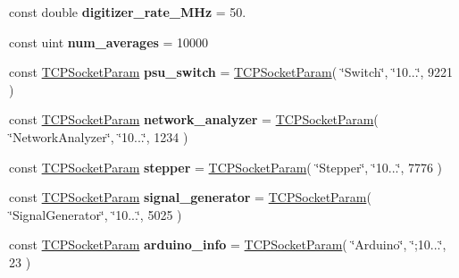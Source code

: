 \begin{DoxyCompactItemize}
\item 
const double {\bfseries digitizer\+\_\+rate\+\_\+\+M\+Hz} = 50.\hypertarget{class_program_core_aa9992b9fddefaca7399aa0e4d8915b0e}{}\label{class_program_core_aa9992b9fddefaca7399aa0e4d8915b0e}

\item 
const uint {\bfseries num\+\_\+averages} = 10000\hypertarget{class_program_core_abce03c26b1e9faefd046b7e2dd4d4b66}{}\label{class_program_core_abce03c26b1e9faefd046b7e2dd4d4b66}

\item 
const \hyperlink{struct_t_c_p_socket_param}{T\+C\+P\+Socket\+Param} {\bfseries psu\+\_\+switch} = \hyperlink{struct_t_c_p_socket_param}{T\+C\+P\+Socket\+Param}( \char`\"{}Switch\char`\"{}, \char`\"{}10...\char`\"{}, 9221 )\hypertarget{class_program_core_a18db700c26844c7ed10e13f3dd0cffbc}{}\label{class_program_core_a18db700c26844c7ed10e13f3dd0cffbc}

\item 
const \hyperlink{struct_t_c_p_socket_param}{T\+C\+P\+Socket\+Param} {\bfseries network\+\_\+analyzer} = \hyperlink{struct_t_c_p_socket_param}{T\+C\+P\+Socket\+Param}( \char`\"{}Network\+Analyzer\char`\"{}, \char`\"{}10...\char`\"{}, 1234 )\hypertarget{class_program_core_acd4885b458ad85149c05a80173e80d83}{}\label{class_program_core_acd4885b458ad85149c05a80173e80d83}

\item 
const \hyperlink{struct_t_c_p_socket_param}{T\+C\+P\+Socket\+Param} {\bfseries stepper} = \hyperlink{struct_t_c_p_socket_param}{T\+C\+P\+Socket\+Param}( \char`\"{}Stepper\char`\"{}, \char`\"{}10...\char`\"{}, 7776 )\hypertarget{class_program_core_a6e15b2406364dccbf520eaff3c052121}{}\label{class_program_core_a6e15b2406364dccbf520eaff3c052121}

\item 
const \hyperlink{struct_t_c_p_socket_param}{T\+C\+P\+Socket\+Param} {\bfseries signal\+\_\+generator} = \hyperlink{struct_t_c_p_socket_param}{T\+C\+P\+Socket\+Param}( \char`\"{}Signal\+Generator\char`\"{}, \char`\"{}10...\char`\"{}, 5025 )\hypertarget{class_program_core_aa6ae7b4297a8d148cad8d360a6ca605b}{}\label{class_program_core_aa6ae7b4297a8d148cad8d360a6ca605b}

\item 
const \hyperlink{struct_t_c_p_socket_param}{T\+C\+P\+Socket\+Param} {\bfseries arduino\+\_\+info} = \hyperlink{struct_t_c_p_socket_param}{T\+C\+P\+Socket\+Param}( \char`\"{}Arduino\char`\"{}, \char`\"{};10...\char`\"{}, 23 )\hypertarget{class_program_core_a3690a566c0bb5a0a72ba8bf0b5958c16}{}\label{class_program_core_a3690a566c0bb5a0a72ba8bf0b5958c16}


\end{DoxyCompactItemize}
